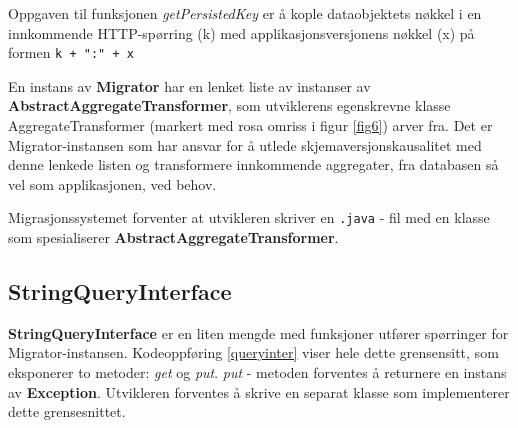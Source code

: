 Oppgaven til funksjonen \emph{getPersistedKey} er å kople dataobjektets nøkkel i en innkommende HTTP-spørring (k) med applikasjonsversjonens nøkkel (x) på formen \texttt{k + ":" + x}

En instans av \textbf{Migrator} har en lenket liste av instanser av \textbf{AbstractAggregateTransformer}, som utviklerens egenskrevne klasse AggregateTransformer (markert med rosa omriss i figur \ref{fig6}) arver fra. Det er Migrator-instansen som har ansvar for å utlede skjemaversjonskausalitet med denne lenkede listen og transformere innkommende aggregater, fra databasen så vel som applikasjonen, ved behov.

Migrasjonssystemet forventer at utvikleren skriver en \texttt{.java} - fil med en klasse som spesialiserer \textbf{AbstractAggregateTransformer}.









\subsection{StringQueryInterface}



\textbf{StringQueryInterface} er en liten mengde med funksjoner utfører spørringer for Migrator-instansen. Kodeoppføring \ref{queryinter} viser hele dette grensensitt, som eksponerer to metoder: \emph{get} og \emph{put}. \emph{put} - metoden forventes å returnere en instans av \textbf{Exception}. Utvikleren forventes å skrive en separat klasse som implementerer dette grensesnittet.

